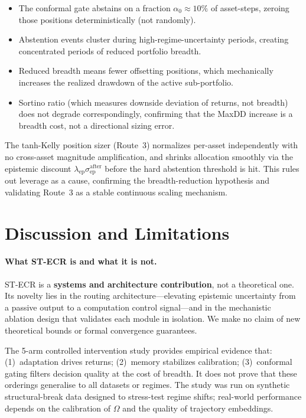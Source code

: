 \documentclass[11pt,a4paper]{article}
\newcommand{\sepa}{\sigma_{\mathrm{ep}}^{\mathrm{after}}}
\begin{document}
\begin{itemize}
\item The conformal gate abstains on a fraction $\alpha_0 \approx 10\%$ of
  asset-steps, zeroing those positions deterministically (not randomly).
\item Abstention events cluster during high-regime-uncertainty periods, creating
  concentrated periods of reduced portfolio breadth.
\item Reduced breadth means fewer offsetting positions, which mechanically
  increases the realized drawdown of the active sub-portfolio.
\item Sortino ratio (which measures downside deviation of returns, not breadth)
  does not degrade correspondingly, confirming that the MaxDD increase is a
  breadth cost, not a directional sizing error.
\end{itemize}

The tanh-Kelly position sizer (Route~3) normalizes per-asset independently with no
cross-asset magnitude amplification, and shrinks allocation smoothly via the epistemic
discount $\lambda_{\mathrm{ep}}\sepa$ before the hard abstention threshold is hit.
This rules out leverage as a cause, confirming the breadth-reduction hypothesis
and validating Route~3 as a stable continuous scaling mechanism.

\section{Discussion and Limitations}
\label{sec:discussion}

\paragraph{What ST-ECR is and what it is not.}
ST-ECR is a \textbf{systems and architecture contribution}, not a theoretical
one.  Its novelty lies in the routing architecture---elevating epistemic
uncertainty from a passive output to a computation control signal---and in the
mechanistic ablation design that validates each module in isolation.  We make
no claim of new theoretical bounds or formal convergence guarantees.

The 5-arm controlled intervention study provides empirical evidence that:
(1)~adaptation drives returns; (2)~memory stabilizes calibration; (3)~conformal
gating filters decision quality at the cost of breadth.  It does not prove
that these orderings generalise to all datasets or regimes.  The study was
run on synthetic structural-break data designed to stress-test regime shifts;
real-world performance depends on the calibration of $\Omega$ and the quality
of trajectory embeddings.
\end{document}
